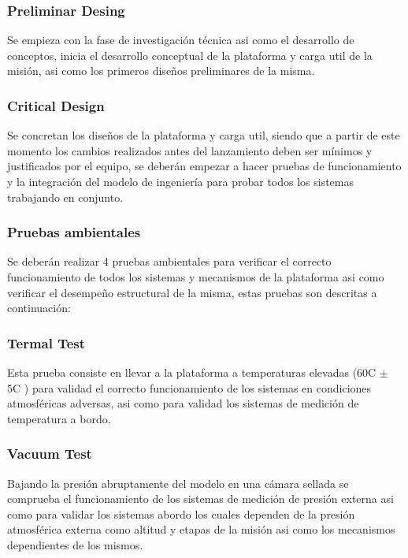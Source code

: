 \documentclass[letterpaper,12pt]{article} %
\begin{document}
    \subsubsection{Preliminar Desing}

        Se empieza con la fase de investigación técnica asi como el desarrollo
        de conceptos, inicia el desarrollo conceptual de la plataforma y carga util de la misión, asi como los primeros diseños 
        preliminares de la misma.    

    \subsubsection{Critical Design}

        Se concretan los diseños de la plataforma y carga util, siendo que a partir de este momento los cambios realizados antes del 
        lanzamiento deben ser mínimos y justificados por el equipo, se deberán empezar a hacer pruebas de funcionamiento y la integración del 
        modelo de ingeniería para probar todos los sistemas trabajando en conjunto.

    \subsubsection{Pruebas ambientales}

        Se deberán realizar 4 pruebas ambientales para verificar el correcto funcionamiento de todos los sistemas y mecanismos de la plataforma 
        asi como verificar el desempeño estructural de la misma, estas pruebas son descritas a continuación:

        \subsubsection*{Termal Test}
        Esta prueba consiste en llevar a la plataforma a temperaturas elevadas (60C $\pm$ 5C ) para validad el correcto funcionamiento de los sistemas en 
        condiciones atmosféricas adversas, asi como para validad los sistemas de medición de temperatura a bordo.

        \subsubsection*{Vacuum Test}
        
        Bajando la presión abruptamente del modelo en una cámara sellada se comprueba el funcionamiento de los sistemas de medición de presión externa
        asi como para validar los sistemas abordo los cuales dependen de la presión atmosférica externa como altitud y etapas de la misión asi como los mecanismos dependientes
        de los mismos.
\end{document}
